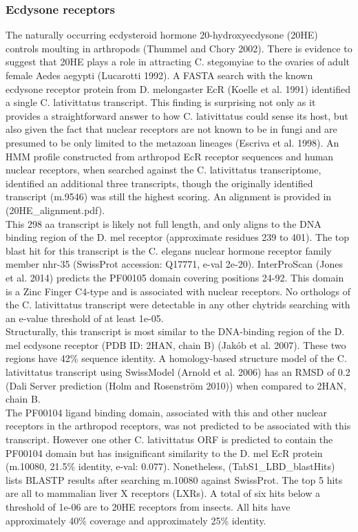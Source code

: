 \subsubsection{Ecdysone receptors}
The naturally occurring ecdysteroid hormone 20-hydroxyecdysone (20HE) controls moulting in arthropods (Thummel and Chory 2002). There is evidence to suggest that 20HE plays a role in attracting C. stegomyiae to the ovaries of adult female Aedes aegypti (Lucarotti 1992). A FASTA search with the known ecdysone receptor protein from D. melongaster EcR (Koelle et al. 1991) identified a single C. lativittatus transcript. This finding is surprising not only as it provides a straightforward answer to how C. lativittatus could sense its host, but also given the fact that nuclear receptors are not known to be in fungi and are presumed to be only limited to the metazoan lineages (Escriva et al. 1998). An HMM profile constructed from arthropod EcR receptor sequences and human nuclear receptors, when searched against the C. lativittatus transcriptome, identified an additional three transcripts, though the originally identified transcript (m.9546) was still the highest scoring. An alignment is provided in (20HE\_alignment.pdf).\\
\indent This 298 aa transcript is likely not full length, and only aligns to the DNA binding region of the D. mel receptor (approximate residues 239 to 401). The top blast hit for this transcript is the C. elegans nuclear hormone receptor family member nhr-35 (SwissProt accession: Q17771, e-val 2e-20). InterProScan (Jones et al. 2014) predicts the PF00105 domain covering positions 24-92. This domain is a Zinc Finger C4-type and is associated with nuclear receptors. No orthologs of the C. lativittatus transcript were detectable in any other chytrids searching with an e-value threshold of at least 1e-05. \\
\indent Structurally, this transcript is most similar to the DNA-binding region of the D. mel ecdysone receptor (PDB ID: 2HAN, chain B) (Jakób et al. 2007). These two regions have 42\% sequence identity. A homology-based structure model of the C. lativittatus transcript using SwissModel (Arnold et al. 2006) has an RMSD of 0.2 (Dali Server prediction (Holm and Rosenström 2010)) when compared to 2HAN, chain B. \\
\indent The PF00104 ligand binding domain, associated with this and other nuclear receptors in the arthropod receptors, was not predicted to be associated with this transcript. However one other C. lativittatus ORF is predicted to contain the PF00104 domain but has insignificant similarity to the D. mel EcR protein (m.10080, 21.5\% identity, e-val: 0.077). Nonetheless, (TabS1\_LBD\_blastHits) lists BLASTP results after searching m.10080 against SwissProt. The top 5 hits are all to mammalian liver X receptors (LXRs). A total of six hits below a threshold of 1e-06 are to 20HE receptors from insects. All hits have approximately 40\% coverage and approximately 25\% identity. \\
